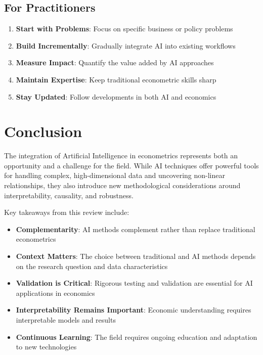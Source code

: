 \documentclass[12pt,a4paper]{article}
\begin{document}
\subsection{For Practitioners}

\begin{enumerate}
    \item \textbf{Start with Problems}: Focus on specific business or policy problems
    \item \textbf{Build Incrementally}: Gradually integrate AI into existing workflows
    \item \textbf{Measure Impact}: Quantify the value added by AI approaches
    \item \textbf{Maintain Expertise}: Keep traditional econometric skills sharp
    \item \textbf{Stay Updated}: Follow developments in both AI and economics
\end{enumerate}

\section{Conclusion}

The integration of Artificial Intelligence in econometrics represents both an opportunity and a challenge for the field. While AI techniques offer powerful tools for handling complex, high-dimensional data and uncovering non-linear relationships, they also introduce new methodological considerations around interpretability, causality, and robustness.

Key takeaways from this review include:

\begin{itemize}
    \item \textbf{Complementarity}: AI methods complement rather than replace traditional econometrics
    \item \textbf{Context Matters}: The choice between traditional and AI methods depends on the research question and data characteristics
    \item \textbf{Validation is Critical}: Rigorous testing and validation are essential for AI applications in economics
    \item \textbf{Interpretability Remains Important}: Economic understanding requires interpretable models and results
    \item \textbf{Continuous Learning}: The field requires ongoing education and adaptation to new technologies
\end{itemize}
\end{document}
